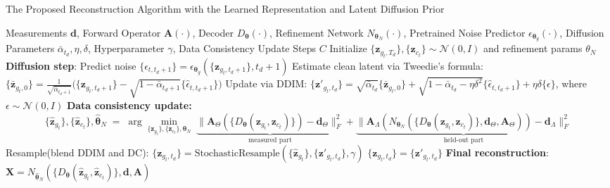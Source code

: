 \documentclass[journal,twoside,web]{ieeecolor}
\begin{document}
\begin{algorithm*}[t]
\caption{The Proposed Reconstruction Algorithm with the Learned Representation and Latent Diffusion Prior}
\label{alg:resample}
\begin{algorithmic}[1]
\REQUIRE Measurements $\mathbf{d}$, Forward Operator $\mathbf{A}(\cdot)$, Decoder $D_{\boldsymbol{\theta}}(\cdot)$, Refinement Network $N_{\boldsymbol{\theta}_N}(\cdot)$, Pretrained Noise Predictor $\epsilon_{\boldsymbol{\theta}_{g}}(\cdot)$, Diffusion Parameters $\bar{\alpha}_{t_d}, \eta, \delta$, Hyperparameter $\gamma$, Data Consistency Update Steps $C$ 
\STATE Initialize $\{\mathbf{z}_{g_t,T_d}\}, \{{\mathbf{z}}_{c_t}\} \sim \mathcal{N}(0,I)$ and refinement params $\theta_N$
  \STATE \textbf{Diffusion step}: Predict noise $\{\hat{\epsilon}_{t,t_d+1}\} = \epsilon_{\boldsymbol{\theta}_{g}}(\{\mathbf{z}_{g_t,t_d+1}\}, t_d+1)$
  \STATE Estimate clean latent via Tweedie’s formula: $\{\bar{\mathbf{z}}_{g_t,0}\} = \tfrac{1}{\sqrt{\bar{\alpha}_{t_d+1}}}\Big(\{\mathbf{z}_{g_t,t_d+1}\} - \sqrt{1-\bar{\alpha}_{t_d+1}} \{\hat{\epsilon}_{t,t_d+1}\}\Big)$
  \STATE Update via DDIM:
  $ \{\mathbf{z}'_{g_t,t_d}\} = \sqrt{\bar{\alpha}_{t_d}}\{\bar{\mathbf{z}}_{g_t,0}\} + \sqrt{1-\bar{\alpha}_{t_d}-\eta\delta^2}\{\hat{\epsilon}_{t,t_d+1}\} + \eta\delta \{\epsilon\}$, where $\epsilon \sim \mathcal{N}(0,I)$
   \STATE \textbf{Data consistency update:} 
    \[
    \{\hat{\mathbf{z}}_{g_t}\},\{\hat{\mathbf{z}}_{c_t}\},\hat{\boldsymbol{\theta}}_N\;=\;\arg\min_{\{\mathbf{z}_{g_t}\},\{\mathbf{z}_{c_t}\},{\boldsymbol{\theta}}_N}\;
    \underbrace{\|\mathbf{A}_\Theta(\{D_{\boldsymbol{\theta}}(\mathbf{z}_{g_t},\mathbf{z}_{c_t})\})-\mathbf{d}_\Theta\|_F^2}_{\text{measured part}}
    +\underbrace{\|\mathbf{A}_\Lambda(N_{\boldsymbol{\theta}_N}(\{D_{\boldsymbol{\theta}}(\mathbf{z}_{g_t},\mathbf{z}_{c_t})\},\mathbf{d}_\Theta,\mathbf{A}_\Theta))-\mathbf{d}_\Lambda\|_F^2}_{\text{held-out part}}
    \]
    \STATE Resample(blend DDIM and DC): $\{\mathbf{z}_{g_t,t_d}\}= \text{StochasticResample}(\{\hat{\mathbf{z}}_{g_t}\}, \{\mathbf{z}'_{g_t,t_d}\}, \gamma)$
  \ELSE
    \STATE $\{\mathbf{z}_{g_t,t_d}\} = \{\mathbf{z}'_{g_t,t_d}\}$
  \ENDIF
\ENDFOR
\STATE \textbf{Final reconstruction}: $\mathbf{X} = N_{\hat{\boldsymbol{\theta}}_N}(\{D_{\boldsymbol{\theta}}(\hat{\mathbf{z}}_{g_t},\hat{\mathbf{z}}_{c_t})\},\mathbf{d},\mathbf{A})$
\end{algorithmic}
\end{algorithm*}
\end{document}
